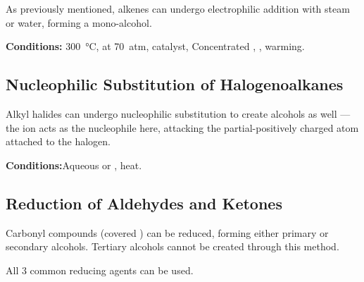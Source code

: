			As previously mentioned, alkenes can undergo electrophilic addition with steam or water, forming a mono-alcohol.


			\vspace{1.5em}
			\vbox{\textbf{Conditions:}	\tabto{35mm}\SI{300}{\celsius}, at \SI{70}{atm},  catalyst, 
										\tabto{35mm}Concentrated , , warming.}




		\pagebreak
		\subsection{Nucleophilic Substitution of Halogenoalkanes}

			Alkyl halides can undergo nucleophilic substitution to create alcohols as well --- the  ion acts as the
			nucleophile here, attacking the partial-positively charged  atom attached to the halogen.

			\vspace{1.5em}
			\vbox{\textbf{Conditions:}\tabto{35mm}Aqueous  or , heat.}

			\diagram[1.0]{
				\schemestart[0,1.5,thick]
					\chemfig{!\molR-[:0]!\molX}
					\hspace{2mm} + \hspace{2mm}
					\chemfig{!\molOH\mch}
					\arrow
					\chemfig{!\molR-[:0]!\molOH}
					\hspace{2mm} + \hspace{2mm}
					\chemfig{!\molX\mch}
				\schemestop
			}


		\subsection{Reduction of Aldehydes and Ketones}

			Carbonyl compounds (covered \hyperlink{ChapterAldehydesAndKetones}{}) can be reduced, forming either primary or secondary
			alcohols. Tertiary alcohols cannot be created through this method.

			All 3 common reducing agents can be used.

